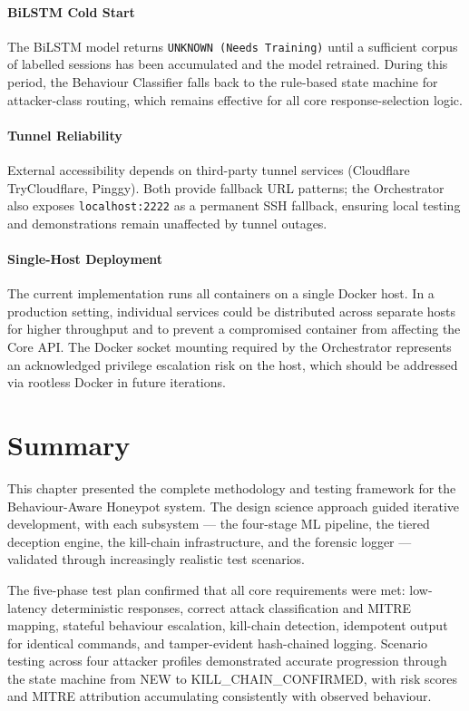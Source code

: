 \paragraph{BiLSTM Cold Start}
The BiLSTM model returns \texttt{UNKNOWN (Needs Training)} until a sufficient corpus of labelled sessions has been accumulated and the model retrained. During this period, the Behaviour Classifier falls back to the rule-based state machine for attacker-class routing, which remains effective for all core response-selection logic.

\paragraph{Tunnel Reliability}
External accessibility depends on third-party tunnel services (Cloudflare TryCloudflare, Pinggy). Both provide fallback URL patterns; the Orchestrator also exposes \texttt{localhost:2222} as a permanent \ac{SSH} fallback, ensuring local testing and demonstrations remain unaffected by tunnel outages.

\paragraph{Single-Host Deployment}
The current implementation runs all containers on a single Docker host. In a production setting, individual services could be distributed across separate hosts for higher throughput and to prevent a compromised container from affecting the Core API. The Docker socket mounting required by the Orchestrator represents an acknowledged privilege escalation risk on the host, which should be addressed via rootless Docker in future iterations.

\section{Summary}

This chapter presented the complete methodology and testing framework for the Behaviour-Aware Honeypot system. The design science approach guided iterative development, with each subsystem — the four-stage ML pipeline, the tiered deception engine, the kill-chain infrastructure, and the forensic logger — validated through increasingly realistic test scenarios.

The five-phase test plan confirmed that all core requirements were met: low-latency deterministic responses, correct attack classification and MITRE mapping, stateful behaviour escalation, kill-chain detection, idempotent output for identical commands, and tamper-evident hash-chained logging. Scenario testing across four attacker profiles demonstrated accurate progression through the state machine from NEW to KILL\_CHAIN\_CONFIRMED, with risk scores and MITRE attribution accumulating consistently with observed behaviour.
